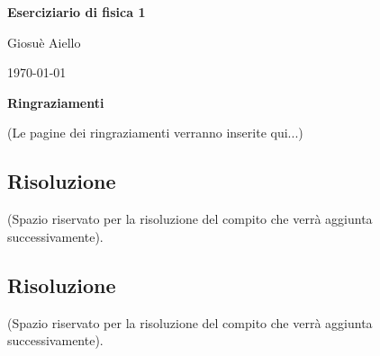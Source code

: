 \documentclass[12pt,a4paper]{article}
\begin{document}
\begin{titlepage}
    \centering
    \vspace*{4cm}
    {\Huge \bfseries Eserciziario di fisica 1 \par}
    \vspace{2cm}
    {\Large Giosuè Aiello \par}
    \vfill
    {\large \today \par}
\end{titlepage}

\newpage
\thispagestyle{empty}
\vspace*{5cm}
\begin{center}
\Large \textbf{Ringraziamenti}
\end{center}
\vspace{1cm}
\noindent (Le pagine dei ringraziamenti verranno inserite qui...)
\clearpage

\tableofcontents
\clearpage




\newpage
\subsection{Risoluzione}
(Spazio riservato per la risoluzione del compito che verrà aggiunta successivamente).


\newpage


\newpage
\subsection{Risoluzione}
(Spazio riservato per la risoluzione del compito che verrà aggiunta successivamente).

\newpage

\end{document}
